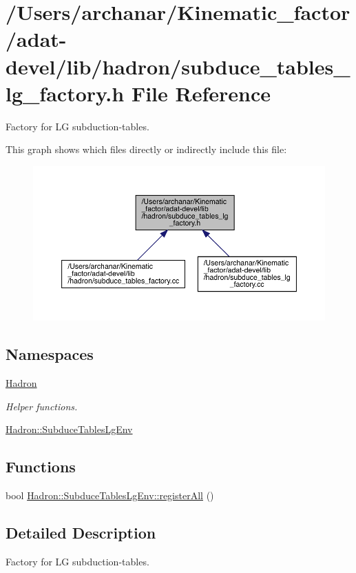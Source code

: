 \hypertarget{adat-devel_2lib_2hadron_2subduce__tables__lg__factory_8h}{}\section{/\+Users/archanar/\+Kinematic\+\_\+factor/adat-\/devel/lib/hadron/subduce\+\_\+tables\+\_\+lg\+\_\+factory.h File Reference}
\label{adat-devel_2lib_2hadron_2subduce__tables__lg__factory_8h}


Factory for LG subduction-\/tables.  


This graph shows which files directly or indirectly include this file\+:
\nopagebreak
\begin{figure}[H]
\begin{center}
\leavevmode
\includegraphics[width=350pt]{dc/da8/adat-devel_2lib_2hadron_2subduce__tables__lg__factory_8h__dep__incl}
\end{center}
\end{figure}
\subsection*{Namespaces}
\begin{DoxyCompactItemize}
\item 
 \mbox{\hyperlink{namespaceHadron}{Hadron}}
\begin{DoxyCompactList}\small\item\em Helper functions. \end{DoxyCompactList}\item 
 \mbox{\hyperlink{namespaceHadron_1_1SubduceTablesLgEnv}{Hadron\+::\+Subduce\+Tables\+Lg\+Env}}
\end{DoxyCompactItemize}
\subsection*{Functions}
\begin{DoxyCompactItemize}
\item 
bool \mbox{\hyperlink{namespaceHadron_1_1SubduceTablesLgEnv_abb63f9dacfb5b881f3052ce08000b859}{Hadron\+::\+Subduce\+Tables\+Lg\+Env\+::register\+All}} ()
\end{DoxyCompactItemize}


\subsection{Detailed Description}
Factory for LG subduction-\/tables. 

